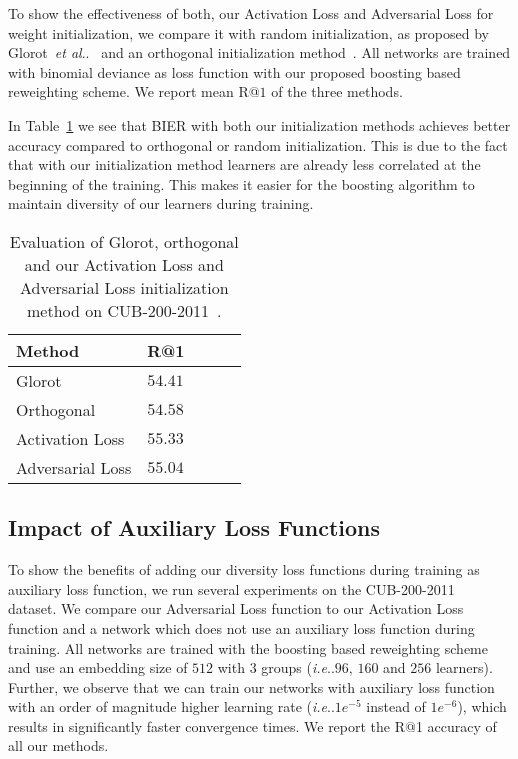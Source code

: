 \documentclass[10pt,journal,compsoc]{IEEEtran}
\makeatletter
\DeclareRobustCommand\onedot{\futurelet\@let@token\@onedot}
\def\@onedot{\ifx\@let@token.\else.\null\fi\xspace}
\def\ie{\emph{i.e}\onedot} \def\Ie{\emph{I.e}\onedot}
\def\etal{\emph{et al}\onedot}
\makeatother
\begin{document}
To show the effectiveness of both, our Activation Loss and Adversarial Loss for weight initialization, we compare it with 
random initialization, as proposed by Glorot~\etal~\cite{Glorot10} and an orthogonal initialization method~\cite{SaxeMG13}. 
All networks are trained with binomial deviance as loss function with our proposed boosting based reweighting scheme.
We report mean R@$1$ of the three methods.

In Table~\ref{tbl:eval-weight-init} we see that \ac{BIER} with both our initialization methods achieves better accuracy
compared to orthogonal or random initialization. This is due to the fact that with our initialization
method learners are already less correlated at the beginning of the training. This makes it easier for the boosting
algorithm to maintain diversity of our learners during training.

\begin{table}[htbp]
\caption{Evaluation of Glorot, orthogonal and our Activation Loss and Adversarial Loss initialization method on CUB-200-2011~\cite{WahCUB_200_2011}.}
\label{tbl:eval-weight-init}
\renewcommand{\arraystretch}{1.3}

\centering
\begin{tabular}{lllll}
\hline
Method                        &  R@1  \\
\hline
Glorot                        &  $54.41$ \\
Orthogonal                    &  $54.58$ \\
\hline
Activation Loss               &  $\boldsymbol{55.33}$  \\
Adversarial Loss               &  $55.04$ \\
\hline
\end{tabular}
\end{table}\subsection{Impact of Auxiliary Loss Functions}\label{sec:eval-auxiliary-loss-function}

To show the benefits of adding our diversity loss functions during training as auxiliary loss function,
we run several experiments on the CUB-200-2011~\cite{WahCUB_200_2011} dataset. We compare our Adversarial Loss
function to our Activation Loss function and a network which does not use an auxiliary loss function during training.
All networks are trained with the boosting based reweighting scheme and use an embedding size of $512$ with $3$ groups (\ie$96$, $160$ and $256$ learners). 
Further, we observe that we can train our networks with auxiliary loss function with an order of magnitude higher learning
rate (\ie$1e^{-5}$ instead of $1e^{-6}$), which results in significantly faster convergence times.
We report the R@1 accuracy of all our methods.
\end{document}
